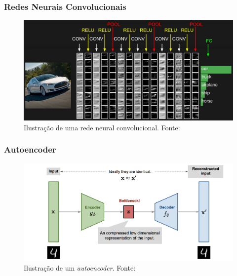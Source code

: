 \documentclass{beamer}
\begin{document}
\begin{frame}
\frametitle{Redes Neurais Convolucionais}
\begin{figure}
\includegraphics[width=\textwidth]{figs/convnet.jpeg}
\caption{Ilustração de uma rede neural convolucional. Fonte:~\cite{cnn}}
\end{figure}
\end{frame}
\begin{frame}
\frametitle{Autoencoder}
\begin{figure}
\includegraphics[width=\textwidth]{figs/ae-architecture.png}
\caption{Ilustração de um \textit{autoencoder}. Fonte:~\cite{ae}}
\end{figure}
\end{frame}
\end{document}
